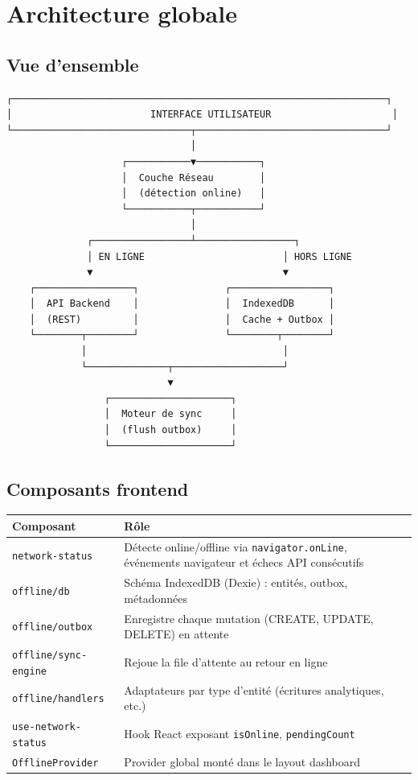 \documentclass[12pt,a4paper]{report}
\begin{document}
\chapter{Architecture globale}

\section{Vue d'ensemble}

\begin{verbatim}
┌─────────────────────────────────────────────────────────────────┐
│                        INTERFACE UTILISATEUR                     │
└───────────────────────────────┬─────────────────────────────────┘
                                │
                    ┌───────────▼───────────┐
                    │  Couche Réseau        │
                    │  (détection online)   │
                    └───────────┬───────────┘
                                │
              ┌─────────────────┴─────────────────┐
              │ EN LIGNE                        │ HORS LIGNE
              ▼                                 ▼
    ┌─────────────────┐               ┌─────────────────┐
    │  API Backend    │               │  IndexedDB      │
    │  (REST)         │               │  Cache + Outbox │
    └────────┬────────┘               └────────┬────────┘
             │                                  │
             └──────────────┬───────────────────┘
                            ▼
                 ┌─────────────────────┐
                 │  Moteur de sync     │
                 │  (flush outbox)     │
                 └─────────────────────┘
\end{verbatim}

\section{Composants frontend}

\begin{longtable}{@{}p{3.5cm}p{9.5cm}@{}}
\hline
\textbf{Composant} & \textbf{Rôle} \\
\hline

\texttt{network-status} & Détecte online/offline via \texttt{navigator.onLine}, événements navigateur et échecs API consécutifs \\
\texttt{offline/db} & Schéma IndexedDB (Dexie) : entités, outbox, métadonnées \\
\texttt{offline/outbox} & Enregistre chaque mutation (CREATE, UPDATE, DELETE) en attente \\
\texttt{offline/sync-engine} & Rejoue la file d'attente au retour en ligne \\
\texttt{offline/handlers} & Adaptateurs par type d'entité (écritures analytiques, etc.) \\
\texttt{use-network-status} & Hook React exposant \texttt{isOnline}, \texttt{pendingCount} \\
\texttt{OfflineProvider} & Provider global monté dans le layout dashboard \\
\hline
\end{longtable}
\end{document}
